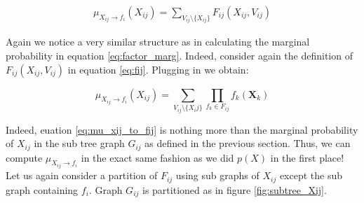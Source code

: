 \begin{equation}\begin{split}
\mu_{X_{ij} \rightarrow f_i}(X_{ij}) = \sum_{V_{ij} \setminus \{X_{ij}\}}
			F_{ij}(X_{ij}, V_{ij})
\end{split}\end{equation}

\noindent
Again we notice a very similar structure as in calculating the marginal
probability in equation \ref{eq:factor_marg}. Indeed, consider again 
the definition of $F_{ij}(X_{ij}, V_{ij})$ in equation \ref{eq:fij}.
Plugging in we obtain:

\begin{equation}\label{eq:mu_xij_to_fij}
\mu_{X_{ij} \rightarrow f_i}(X_{ij}) = \sum_{V_{ij}\setminus \{X_ij\}}
\prod_{f_k \in F_{ij}} f_k(\textbf{X}_k)
\end{equation}

\noindent
Indeed, euation \ref{eq:mu_xij_to_fij} is nothing more than the 
marginal probability of $X_{ij}$ in the sub tree graph $G_{ij}$
as defined in the previous section. Thus, we can compute 
$\mu_{X_{ij} \rightarrow f_i}$ in the exact same fashion as we did
$p(X)$ in the first place! Let us again consider a partition of 
$F_{ij}$ using sub graphs of $X_{ij}$ except the sub graph
containing $f_i$. Graph $G_{ij}$ is partitioned as in figure
\ref{fig:subtree_Xij}.

